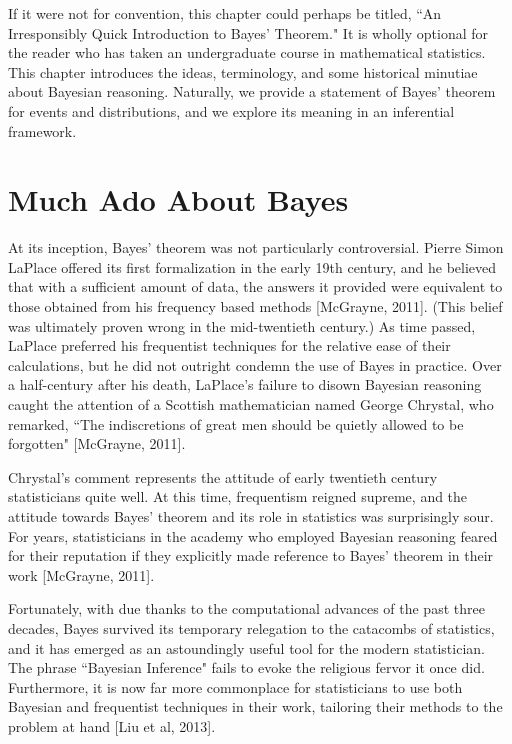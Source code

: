 \documentclass[12pt,twoside]{reedthesis}
\begin{document}
	If it were not for convention, this chapter could perhaps be titled, ``An Irresponsibly Quick Introduction to Bayes' Theorem." It is wholly optional for the reader who has taken an undergraduate course in mathematical statistics. This chapter introduces the ideas, terminology, and some historical minutiae about Bayesian reasoning. Naturally, we provide a statement of Bayes' theorem for events and distributions, and we explore its meaning in an inferential framework. 
	\section{Much Ado About Bayes}
	At its inception, Bayes' theorem was not particularly controversial. Pierre Simon LaPlace offered its first formalization in the early 19th century, and he believed that with a sufficient amount of data, the answers it provided were equivalent to those obtained from his frequency based methods [McGrayne, 2011]. (This belief was ultimately proven wrong in the mid-twentieth century.)
	As time passed, LaPlace preferred his frequentist techniques for the relative ease of their calculations, but he did not outright condemn the use of Bayes in practice. Over a half-century after his death, LaPlace's failure to disown Bayesian reasoning caught the attention of a Scottish mathematician named George Chrystal, who remarked, ``The indiscretions of great men should be quietly allowed to be forgotten" [McGrayne, 2011].
	
	Chrystal's comment represents the attitude of early twentieth century statisticians quite well. At this time, frequentism reigned supreme, and the attitude towards Bayes' theorem and its role in statistics was surprisingly sour. For years, statisticians in the academy who employed Bayesian reasoning feared for their reputation if they explicitly made reference to Bayes' theorem in their work [McGrayne, 2011]. 
	
	Fortunately, with due thanks to the computational advances of the past three decades, Bayes survived its temporary relegation to the catacombs of statistics, and it has emerged as an astoundingly useful tool for the modern statistician. The phrase ``Bayesian Inference" fails to evoke the religious fervor it once did. Furthermore, it is now far more commonplace for statisticians to use both Bayesian and frequentist techniques in their work, tailoring their methods to the problem at hand [Liu et al, 2013].
	
\end{document}
